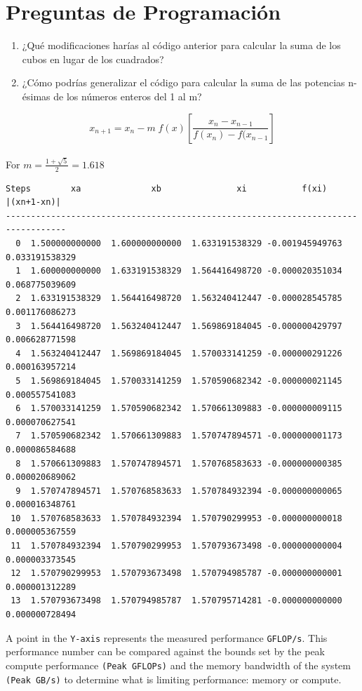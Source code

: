 \documentclass[10pt,a4paper]{article}
\begin{document}
\section*{Preguntas de Programación}
\begin{enumerate}
    \item ¿Qué modificaciones harías al código anterior para calcular la suma de los cubos en lugar de los cuadrados?
    \item ¿Cómo podrías generalizar el código para calcular la suma de las potencias n-ésimas de los números enteros del 1 al m?
\end{enumerate}
\begin{equation}
  x_{n+1}  =  x_n - m\;f(x)\left[\frac{x_n-x_{n-1}}{f(x_n)-f(x_{n-1}}\right]
\end{equation}
\hspace{1mm}\\
For $m=\frac{1+\sqrt{5}}{2}=1.618$\\
\begin{verbatim}
Steps        xa              xb               xi           f(xi)       |(xn+1-xn)|
----------------------------------------------------------------------------------
  0  1.500000000000  1.600000000000  1.633191538329 -0.001945949763  0.033191538329 
  1  1.600000000000  1.633191538329  1.564416498720 -0.000020351034  0.068775039609 
  2  1.633191538329  1.564416498720  1.563240412447 -0.000028545785  0.001176086273 
  3  1.564416498720  1.563240412447  1.569869184045 -0.000000429797  0.006628771598 
  4  1.563240412447  1.569869184045  1.570033141259 -0.000000291226  0.000163957214 
  5  1.569869184045  1.570033141259  1.570590682342 -0.000000021145  0.000557541083 
  6  1.570033141259  1.570590682342  1.570661309883 -0.000000009115  0.000070627541 
  7  1.570590682342  1.570661309883  1.570747894571 -0.000000001173  0.000086584688 
  8  1.570661309883  1.570747894571  1.570768583633 -0.000000000385  0.000020689062 
  9  1.570747894571  1.570768583633  1.570784932394 -0.000000000065  0.000016348761 
 10  1.570768583633  1.570784932394  1.570790299953 -0.000000000018  0.000005367559 
 11  1.570784932394  1.570790299953  1.570793673498 -0.000000000004  0.000003373545 
 12  1.570790299953  1.570793673498  1.570794985787 -0.000000000001  0.000001312289 
 13  1.570793673498  1.570794985787  1.570795714281 -0.000000000000  0.000000728494 
\end{verbatim}
A point in the \verb+Y-axis+ represents the measured performance \verb+GFLOP/s+. This performance number can be compared against the bounds set by the
peak compute performance \verb+(Peak GFLOPs)+ and the memory bandwidth of the system \verb+(Peak GB/s)+ to determine what is limiting performance: memory or compute\cite{Ding_and_Williams}.\cite{Yang_Kurth_Willians}
\end{document}
